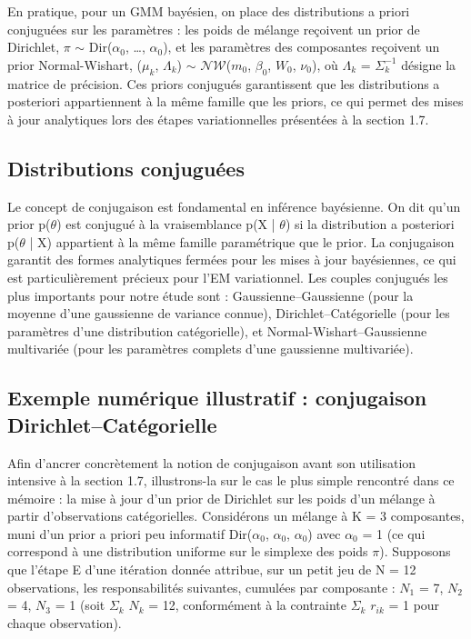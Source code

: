 En pratique, pour un GMM bayésien, on place des distributions a priori conjuguées sur les paramètres : les poids de mélange reçoivent un prior de Dirichlet, $\pi $ $\sim $ Dir($\alpha _{0}$, \ldots{}, $\alpha _{0}$), et les paramètres des composantes reçoivent un prior Normal-Wishart, ($\mu _{k}$, $\Lambda _{k}$) $\sim $ $\mathcal{N}\mathcal{W}$($m_{0}$, $\beta _{0}$, $W_{0}$, $\nu _{0}$), où $\Lambda _{k}$ = $\Sigma _{k}^{-1}$ désigne la matrice de précision. Ces priors conjugués garantissent que les distributions a posteriori appartiennent à la même famille que les priors, ce qui permet des mises à jour analytiques lors des étapes variationnelles présentées à la section 1.7.

\subsection{Distributions conjuguées}
Le concept de conjugaison est fondamental en inférence bayésienne. On dit qu'un prior p($\theta $) est conjugué à la vraisemblance p(X | $\theta $) si la distribution a posteriori p($\theta $ | X) appartient à la même famille paramétrique que le prior. La conjugaison garantit des formes analytiques fermées pour les mises à jour bayésiennes, ce qui est particulièrement précieux pour l'EM variationnel. Les couples conjugués les plus importants pour notre étude sont : Gaussienne--Gaussienne (pour la moyenne d'une gaussienne de variance connue), Dirichlet--Catégorielle (pour les paramètres d'une distribution catégorielle), et Normal-Wishart--Gaussienne multivariée (pour les paramètres complets d'une gaussienne multivariée).

\subsection{Exemple numérique illustratif : conjugaison Dirichlet--Catégorielle}
Afin d'ancrer concrètement la notion de conjugaison avant son utilisation intensive à la section 1.7, illustrons-la sur le cas le plus simple rencontré dans ce mémoire : la mise à jour d'un prior de Dirichlet sur les poids d'un mélange à partir d'observations catégorielles. Considérons un mélange à K = 3 composantes, muni d'un prior a priori peu informatif Dir($\alpha _{0}$, $\alpha _{0}$, $\alpha _{0}$) avec $\alpha _{0}$ = 1 (ce qui correspond à une distribution uniforme sur le simplexe des poids $\pi $). Supposons que l'étape E d'une itération donnée attribue, sur un petit jeu de N = 12 observations, les responsabilités suivantes, cumulées par composante : $N_{1}$ = 7, $N_{2}$ = 4, $N_{3}$ = 1 (soit $\Sigma _{k}$ $N_{k}$ = 12, conformément à la contrainte $\Sigma _{k}$ $r_{ik}$ = 1 pour chaque observation).

